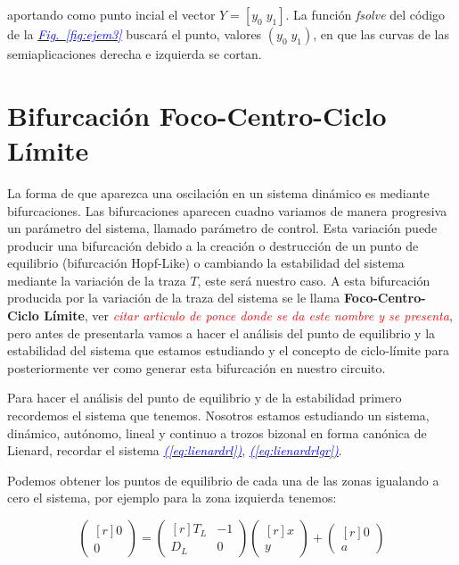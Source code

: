 \documentclass[12pt,a4paper]{report} %
\newcommand{\fref}[1]{\hyperref[#1]{\textcolor{blue}{\textit{Fig.~\ref*{#1}}}}}
\newcommand{\eref}[1]{\hyperref[#1]{\textcolor{blue}{\textit{(\ref*{#1})}}}}
\begin{document}
	\noindent aportando como punto incial el vector $Y=\left[ y_0 \; y_1 \right]$. La función \textit{fsolve} del código de la \fref{fig:ejem3} buscará el punto, valores $\left(y_0\; y_1\right)$, en que las curvas de las semiaplicaciones derecha e izquierda se cortan.
	
	\chapter{Bifurcación Foco-Centro-Ciclo Límite}
	La forma de que aparezca una oscilación en un sistema dinámico es mediante bifurcaciones. Las bifurcaciones aparecen cuadno variamos de manera progresiva un parámetro del sistema, llamado parámetro de control. Esta variación puede producir una bifurcación debido a la creación o destrucción de un punto de equilibrio (bifurcación Hopf-Like) o cambiando la estabilidad del sistema mediante la variación de la traza $T$, este será nuestro caso. A esta bifurcación producida por la variación de la traza del sistema se le llama \textbf{Foco-Centro-Ciclo Límite}, ver \textit{\textcolor{red}{citar articulo de ponce donde se da este nombre y se presenta}}, pero antes de presentarla vamos a hacer el análisis del punto de equilibrio y la estabilidad del sistema que estamos estudiando y el concepto de ciclo-límite para posteriormente ver como generar esta bifurcación en nuestro circuito.
	
		\vspace{0.5cm}Para hacer el análisis del punto de equilibrio y de la estabilidad primero recordemos el sistema que tenemos. Nosotros estamos estudiando un sistema, dinámico, autónomo, lineal y continuo a trozos bizonal en forma canónica de Lienard, recordar el sistema \eref{eq:lienardrl}, \eref{eq:lienardrlgr}.
		
		\vspace{0.5cm}Podemos obtener los puntos de equilibrio de cada una de las zonas igualando a cero el sistema, por ejemplo para la zona izquierda tenemos:
		
		\begin{equation*}
			\begin{pmatrix*}[r]
				0\\ 0
			\end{pmatrix*}= \begin{pmatrix*}[r]
				T_L & -1 \\ D_L & 0
			\end{pmatrix*} \begin{pmatrix*}[r]
				x \\ y
			\end{pmatrix*}+\begin{pmatrix*}[r]
				0 \\ a
			\end{pmatrix*}
		\end{equation*}\smallskip
		
\end{document}
